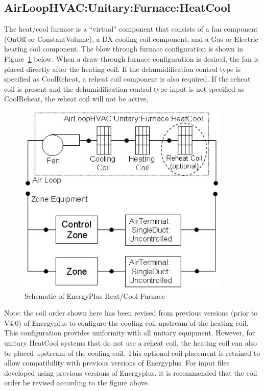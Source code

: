 \subsection{AirLoopHVAC:Unitary:Furnace:HeatCool}\label{airloophvacunitaryfurnaceheatcool}

The heat/cool furnace is a ``virtual'' component that consists of a fan component (OnOff or ConstantVolume), a DX cooling coil component, and a Gas or Electric heating coil component. The blow through furnace configuration is shown in Figure~\ref{fig:schematic-of-energyplus-heatcool-furnace} below. When a draw through furnace configuration is desired, the fan is placed directly after the heating coil. If the dehumidification control type is specified as CoolReheat, a reheat coil component is also required. If the reheat coil is present and the dehumidification control type input is not specified as CoolReheat, the reheat coil will not be active,

\begin{figure}[hbtp] %
\centering
\includegraphics[width=0.9\textwidth, height=0.9\textheight, keepaspectratio=true]{media/image298.png}
\caption{Schematic of EnergyPlus Heat/Cool Furnace \protect \label{fig:schematic-of-energyplus-heatcool-furnace}}
\end{figure}

Note: the coil order shown here has been revised from previous versions (prior to V4.0) of Energyplus to configure the cooling coil upstream of the heating coil. This configuration provides uniformity with all unitary equipment. However, for unitary HeatCool systems that do not use a reheat coil, the heating coil can also be placed upstream of the cooling coil. This optional coil placement is retained to allow compatibility with previous versions of Energyplus. For input files developed using previous versions of Energyplus, it is recommended that the coil order be revised according to the figure above.

